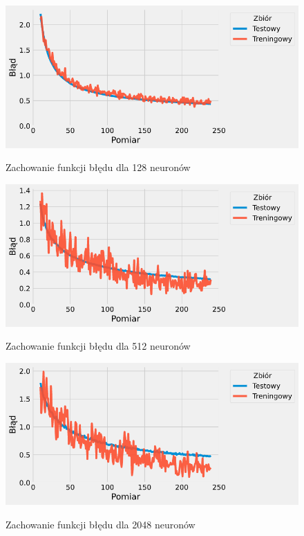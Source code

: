 \documentclass{article}
\begin{document}
\begin{figure}[H]
	\centering
	\caption{Zachowanie funkcji błędu dla 128 neuronów}
	\includegraphics[width=\textwidth]{hidden_err_128.png}
	\label{fig:res14}
\end{figure}
\begin{figure}[H]
	\centering
	\caption{Zachowanie funkcji błędu dla 512 neuronów}
	\includegraphics[width=\textwidth]{hidden_err_512.png}
	\label{fig:res15}
\end{figure}
\begin{figure}[H]
	\centering
	\caption{Zachowanie funkcji błędu dla 2048 neuronów}
	\includegraphics[width=\textwidth]{hidden_err_2048.png}
	\label{fig:res16}
\end{figure}
\end{document}
